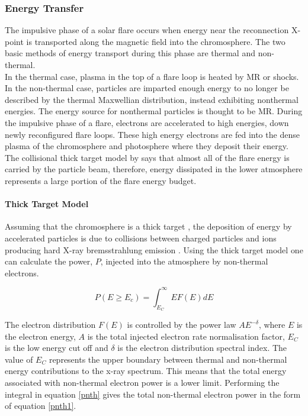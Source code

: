 \subsubsection{Energy Transfer}
The impulsive phase of a solar flare occurs when energy near the reconnection X-point is transported along the magnetic field into the chromosphere. The two basic methods of energy transport during this phase are thermal and non-thermal. \\
In the thermal case, plasma in the top of a flare loop is heated by MR or shocks. In the non-thermal case, particles are imparted enough energy to no longer be described by the thermal Maxwellian distribution, instead exhibiting nonthermal energies. The energy source for nonthermal particles is thought to be MR. During the impulsive phase of a flare, electrons are accelerated to high energies, down newly reconfigured flare loops. These high energy electrons are fed into the dense plasma of the chromosphere and photosphere where they deposit their energy. The collisional thick target model by \cite{1971SoPh...18..489B} says that almost all of the flare energy is carried by the particle beam, therefore, energy dissipated in the lower atmosphere represents a large portion of the flare energy budget.

\paragraph{Thick Target Model} Assuming that the chromosphere is a thick target , the deposition of energy by accelerated particles is due to collisions between charged particles and ions producing hard X-ray bremsstrahlung emission \citep{1967SvA....11..258K}. Using the thick target model \citep{1971SoPh...18..489B} one can calculate the power, $P$, injected into the atmosphere by non-thermal electrons.  
 
\begin{equation}\label{pnth}
P(E \geq E_{c}) = \int_{E_{C}}^{\infty} EF(E)dE
\end{equation}

The electron distribution $F(E)$ is controlled by the power law $AE^{-\delta}$, where $E$ is the electron energy, $A$ is the total injected electron rate normalisation factor, $E_{C}$ is the low energy cut off and $\delta$ is the electron distribution spectral index. The value of $E_{C}$ represents the upper boundary between thermal and non-thermal energy contributions to the x-ray spectrum. This means that the total energy associated with non-thermal electron power is a lower limit. Performing the integral in equation \ref{pnth} gives the total non-thermal electron power in the form of equation \ref{pnth1}.

